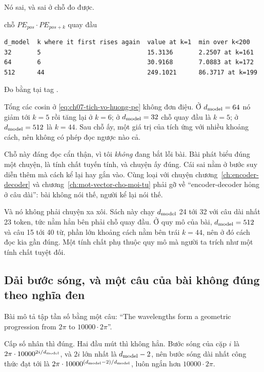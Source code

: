 Nó sai, và sai ở chỗ đo được.

\begin{measured}{chỗ \(PE_{pos} \cdot PE_{pos+k}\) quay đầu}
\begin{verbatim}
d_model  k where it first rises again  value at k=1  min over k<200
32       5                             15.3136       2.2507 at k=161
64       6                             30.9168       7.0883 at k=172
512      44                            249.1021      86.3717 at k=199
\end{verbatim}

Đo bằng  tại tag .
\end{measured}

Tổng các cosin ở \eqref{eq:ch07-tich-vo-huong-pe} không đơn điệu. Ở
\(d_{\mathrm{model}} = 64\) nó giảm tới \(k = 5\) rồi tăng lại ở \(k = 6\); ở
\(d_{\mathrm{model}} = 32\) chỗ quay đầu là \(k = 5\); ở \(d_{\mathrm{model}} = 512\) là \(k = 44\).
Sau chỗ ấy, một giá trị của tích ứng với nhiều khoảng cách, nên không có phép
đọc ngược nào cả.

Chỗ này đáng đọc cẩn thận, vì tôi \emph{không} đang bắt lỗi bài. Bài phát biểu
đúng một chuyện, là tính chất tuyến tính, và chuyện ấy đúng. Cái sai nằm ở bước
suy diễn thêm mà cách kể lại hay gắn vào. Cùng loại với chuyện
chương~\ref{ch:encoder-decoder} và chương~\ref{ch:mot-vector-cho-moi-tu} phải gỡ
về \enquote{encoder-decoder hỏng ở câu dài}: bài không nói thế, người kể lại nói
thế.

Và nó không phải chuyện xa xôi. Sách này chạy \(d_{\mathrm{model}}\) 24 tới 32 với câu dài
nhất 23 token, tức nằm hẳn bên phải chỗ quay đầu. Ở quy mô của bài,
\(d_{\mathrm{model}} = 512\) và câu 15 tới 40 từ, phần lớn khoảng cách nằm bên trái
\(k = 44\), nên ở đó cách đọc kia gần đúng. Một tính chất phụ thuộc quy mô mà
người ta trích như một tính chất tuyệt đối.

\subsection*{Dải bước sóng, và một câu của bài không đúng theo nghĩa đen}

%
Bài mô tả tập tần số bằng một câu: \enquote{The wavelengths form a geometric
progression from \(2\pi\) to \(10000 \cdot 2\pi\)}.

Cấp số nhân thì đúng. Hai đầu mút thì không hẳn. Bước sóng của cặp \(i\) là
\(2\pi \cdot 10000^{2i/d_{\mathrm{model}}}\), và \(2i\) lớn nhất là \(d_{\mathrm{model}} - 2\), nên
bước sóng dài nhất công thức đạt tới là \(2\pi \cdot 10000^{(d_{\mathrm{model}}-2)/d_{\mathrm{model}}}\),
luôn ngắn hơn \(10000 \cdot 2\pi\).

